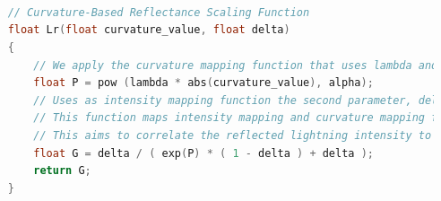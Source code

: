 \begin{lstlisting}[language=C++, caption=Enhanced Blinn-Phong subroutine and Curvature-Based Reflectance scaling function implemented in fragment shader,label={code:blinn-phong-enhanced}]
	
	
	
	// Curvature-Based Reflectance Scaling Function
	float Lr(float curvature_value, float delta)
	{
		// We apply the curvature mapping function that uses lambda and alpha parameters to apply non-linear mapping
		float P = pow (lambda * abs(curvature_value), alpha);
		// Uses as intensity mapping function the second parameter, delta
		// This function maps intensity mapping and curvature mapping functions in the reflectance radiance equation
		// This aims to correlate the reflected lightning intensity to surface curvature
		float G = delta / ( exp(P) * ( 1 - delta ) + delta );
		return G;
	}














\end{lstlisting}
